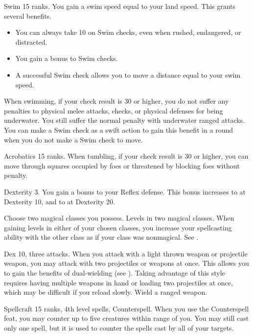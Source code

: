 \featpre Swim 15 ranks.
\featben You gain a swim speed equal to your land speed.
This grants several benefits.
\begin{itemize}
    \item You can always take 10 on Swim checks, even when rushed, endangered, or distracted.
    \item You gain a  bonus to Swim checks.
    \item A successful Swim check allows you to move a distance equal to your swim speed.
\end{itemize}

When swimming, if your check result is 30 or higher, you do not suffer any penalties to physical melee attacks, checks, or physical defenses for being underwater.
You still suffer the normal penalty with underwater ranged attacks.
You can make a Swim check as a swift action to gain this benefit in a round when you do not make a Swim check to move.

\featpre Acrobatics 15 ranks.
\featben When tumbling, if your check result is 30 or higher, you can move through squares occupied by foes or threatened by blocking foes without penalty.

\featpre Dexterity 3.
\featben You gain a  bonus to your Reflex defense.
This bonus increases to  at Dexterity 10, and to  at Dexterity 20.

Choose two magical classes you possess.
\featpres
Levels in two magical classes.
\featben When gaining levels in either of your chosen classes, you increase your spellcasting ability with the other class as if your class was nonmagical.
See .

\featpres Dex 10, three attacks.
\featben When you attack with a light thrown weapon or projectile weapon, you may attack with two projectiles or weapons at once.
This allows you to gain the benefits of dual-wielding (see ).
Taking advantage of this style requires having multiple weapons in hand or loading two projectiles at once, which may be difficult if you reload slowly.
\stylereq Wield a ranged weapon.

\featpres Spellcraft 15 ranks, 4th level spells, Counterspell.
\featben When you use the Counterspell feat, you may counter up to five creatures within \rngmed range of you.
You may still cast only one spell, but it is used to counter the spells cast by all of your targets.

